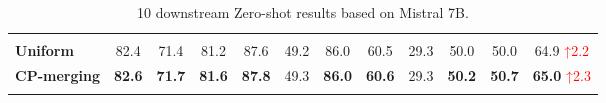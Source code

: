 \documentclass[10pt]{article} %
\begin{document}
\begin{table}[ht]
\begin{adjustbox}
\begin{tabular}{l|cccccccccc|c}
\midrule
\rowcolor{lightgray}\multicolumn{12}{c}{\textbf{Mistral (7B) with C-LoRA library }} \\
\textbf{Uniform}  & 82.4  & 71.4 & 81.2 & 87.6 & 49.2 & 86.0 & 60.5  & 29.3 & 50.0 & 50.0 & \cellcolor[HTML]{FDE9E8}64.9 \textcolor{red}{\scriptsize ↑2.2} \\ 
\textbf{CP-merging} & \textbf{82.6} & \textbf{71.7} & \textbf{81.6} & \textbf{87.8} & 49.3  & \textbf{86.0} & \textbf{60.6} & 29.3  & \textbf{50.2}  & \textbf{50.7} & \cellcolor[HTML]{FDE9E8}\textbf{65.0} \textcolor{red}{\scriptsize ↑2.3} \\ \hline

\Xhline{1.6pt}
\end{tabular}
\end{adjustbox}
\caption{10 downstream Zero-shot results based on Mistral 7B.}
\label{tab:zeroshot_mistral}
\end{table}
\end{document}
